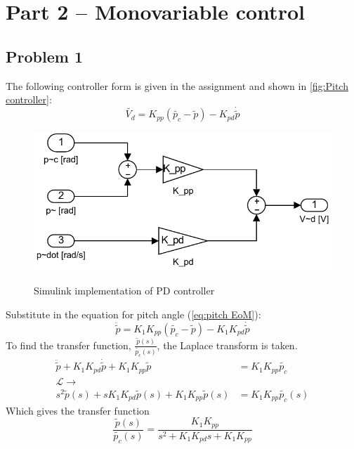 
\section{Part 2 -- Monovariable control}
%
\subsection{Problem 1}
The following controller form is given in the
assignment\cite[p.15]{assignment} and shown in \cref{fig:Pitch
  controller}:
%
\begin{equation}
  \label{eq:pd_controller}
  \tilde{V_d} = K_{pp}(\tilde{p_c} - \tilde{p}) - K_{pd} \dot{\tilde{p}}
\end {equation}
%
\begin{figure}[hbp]
\caption{Simulink implementation of PD controller}
	\centering
		\includegraphics{images/pd_pitch_control.pdf}
	\label{fig:Pitch controller}
\end{figure}
Substitute in the equation for pitch
angle (\cref{eq:pitch EoM}):
%
\begin{equation}
  \label{eq:pitch_with_pd}
  \ddot{\tilde{p}} = K_1 K_{pp}(\tilde{p_c} - \tilde{p}) - K_1 K_{pd}
  \dot{\tilde{p}}
\end{equation}
%
To find the transfer
function, $\frac{\tilde{p}(s)}{\tilde{p_c}(s)}$, the Laplace transform
is taken.
%
\begin{align*}
  \ddot{\tilde{p}} + K_1 K_{pd}\dot{\tilde{p}}
  + K_1K_{pp}\tilde{p} &= K_1 K_{pp}\tilde{p_c} \\
  \mathcal{L}\rightarrow&  \\
  s^2\tilde{p}(s) + sK_1K_{pd}\tilde{p}(s)
  + K_1K_{pp}\tilde{p}(s) &= K_1K_{pp}\tilde{p_c}(s)
\end{align*}
%
Which gives the transfer function
%
\begin{equation}
  \label{eq:trans_func}
  \frac{\tilde{p}(s)}{\tilde{p_c}(s)} =
  \frac{K_1K_{pp}}{s^2+K_1K_{pd}s+K_1K_{pp}}
\end{equation}
